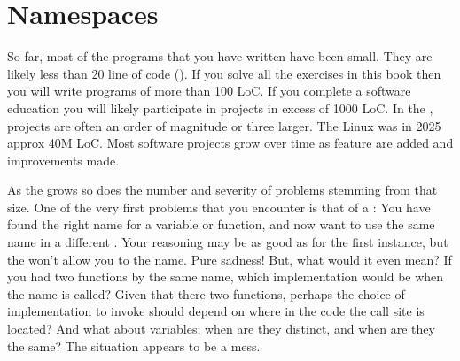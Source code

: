 \chapter{Namespaces}

So far, most of the programs that you have written have been small. They are likely less than 20 line of code (). If you solve all the exercises in this book then you will write programs of more than 100 LoC. If you complete a software education you will likely participate in projects in excess of 1000 LoC. In the , projects are often an order of magnitude or three larger. The Linux  was in 2025 approx 40M LoC. Most software projects grow over time as feature are added and improvements made.

As the  grows so does the number and severity of problems stemming from that size. One of the very first problems that you encounter is that of a : You have found the right name for a variable or function, and now want to use the same name in a different . Your reasoning may be as good as for the first instance, but the  won't allow you to  the name. Pure sadness! But, what would it even mean? If you had two functions by the same name, which implementation would be  when the name is called? Given that there two functions, perhaps the choice of implementation to invoke should depend on where in the code the call site is located? And what about variables; when are they distinct, and when  are they the same? The situation appears to be a mess.

